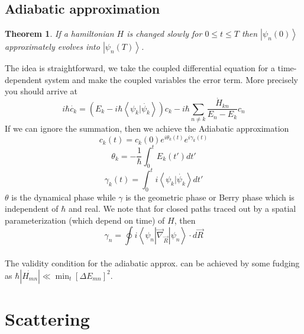 \documentclass{article}
\newcommand{\ket}[1]{\left|#1\right\rangle}
\newcommand{\braket}[2]{\left\langle#1 |  #2\right\rangle}
\newtheorem{thm}{Theorem}
\begin{document}
\subsection{Adiabatic approximation}
\begin{thm}
If a hamiltonian $H$ is changed slowly for $0\leq t\leq T$ then $\ket{\psi_n(0)}$ approximately evolves into $\ket{\psi_n(T)}$.
\end{thm}
\noindent The idea is straightforward, we take the coupled differential equation for a time-dependent system and make the coupled variables the error term. More precisely you should arrive at
$$i\hbar \dot{c_k}=\left(E_k-i\hbar \braket{\psi_k}{\dot{\psi_k}}\right)c_k-i\hbar \sum_{n\neq k} \frac{\dot{H}_{kn}}{E_n-E_k}c_n$$
If we can ignore the summation, then we achieve the Adiabatic approximation
\begin{equation}
\boxed{
c_k(t) = c_k (0) e^{i\theta_k (t)} e^{i\gamma_k(t)}}
\end{equation}
\begin{equation}
\boxed{
\theta_k = -\frac{1}{\hbar} \int_0^t E_k(t') dt'}
\end{equation}
\begin{equation}
\boxed{
\gamma_k(t) = \int_0^t i\braket{\psi_k}{\dot{\psi_k}}dt'}
\end{equation}
$\theta$ is the dynamical phase while $\gamma$ is the geometric phase or Berry phase which is independent of $\hbar$ and real. We note that for closed paths traced out by a spatial parameterization (which depend on time) of $H$, then $$\gamma_n=\oint i\braket{\psi_n}{\vec{\nabla}_{\vec{R}} |\psi_n}\cdot d\vec{R}$$
\\The validity condition for the adiabatic approx. can be achieved by some fudging as $\displaystyle \hbar |\dot{H_{mn}}| \ll \min_{t} [\Delta E_{mn}]^2$.
\section{Scattering}
\end{document}
